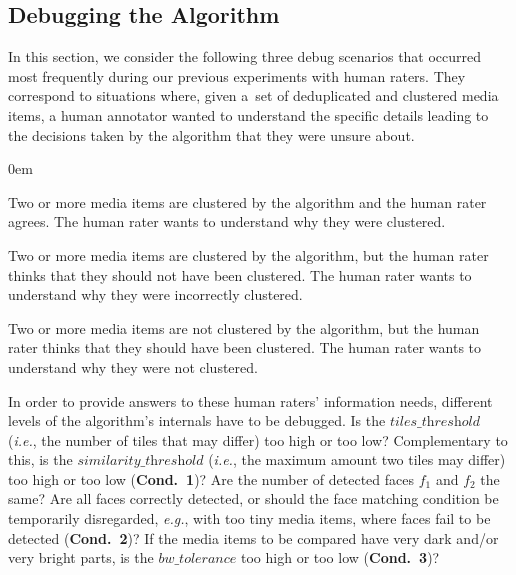 \documentclass{article}
\begin{document}
\subsection{Debugging the Algorithm}
\label{sec:debugging-the-algorithm}
In this section, we consider the following three debug scenarios that occurred most frequently during our previous experiments with human raters. They correspond to situations where, given a~set of deduplicated and clustered media items, a human annotator wanted to understand the specific details leading to the decisions taken by the algorithm that they were unsure about.
\begin{description}
  \itemsep0em
  \item[Clustering Consent.] Two or more media items are clustered by the algorithm and the human rater agrees. The human rater wants to understand why they were clustered.
  \item[Clustering Dissent.] Two or more media items are clustered by the algorithm, but the human rater thinks that they should not have been clustered. The human rater wants to understand why they were incorrectly clustered.
  \item[Non-Clustering Dissent.] Two or more media items are not clustered by the algorithm, but the human rater thinks that they should have been clustered. The human rater wants to understand why they were not clustered.
\end{description}

In order to provide answers to these human raters' information needs, different levels of the algorithm's internals have to be debugged. Is the $\textit{tiles\_threshold}$ (\emph{i.e.}, the number of tiles that may differ) too high or too low? Complementary to this, is the $\textit{similarity\_threshold}$ (\emph{i.e.}, the maximum amount two tiles may differ) too high or too low (\textbf{Cond.~1})? Are the number of detected faces $f_1$ and $f_2$ the same? Are all faces correctly detected, or should the face matching condition be temporarily disregarded, \emph{e.g.}, with too tiny media items, where faces fail to be detected (\textbf{Cond.~2})? If the media items to be compared have very dark and/or very bright parts, is the $\textit{bw\_tolerance}$ too high or too low (\textbf{Cond.~3})?
\end{document}

